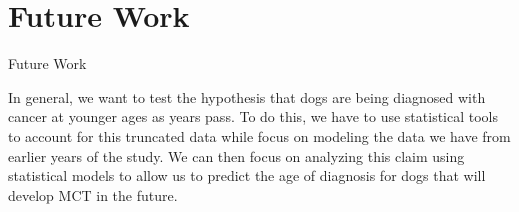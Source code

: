 \documentclass{beamer}
\begin{document}
\section{Future Work}

\begin{frame}{Future Work}

In general, we want to test the hypothesis that dogs are being diagnosed with cancer at younger ages as years pass. To do this, we have to use statistical tools to account for this truncated data while focus on modeling the data we have from earlier years of the study. We can then focus on analyzing this claim using statistical models to allow us to predict the age of diagnosis for dogs that will develop MCT in the future.

\end{frame}
\end{document}
